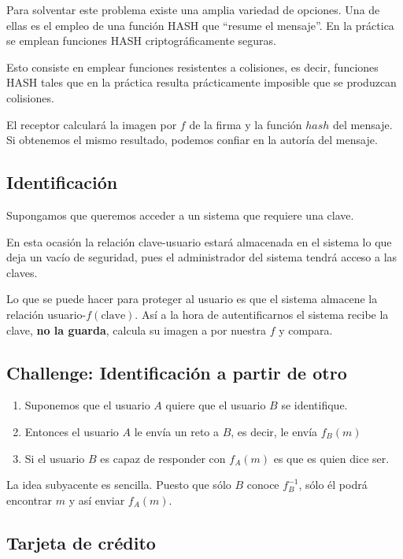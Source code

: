 Para solventar este problema existe una amplia variedad de opciones. Una de ellas es el empleo de una función HASH que ``resume el mensaje''. En la práctica se emplean funciones HASH criptográficamente seguras.

Esto consiste en emplear funciones resistentes a colisiones, es decir, funciones HASH tales que en la práctica resulta prácticamente imposible que se produzcan colisiones.

\begin{remark}
El receptor calculará la imagen por $f$ de la firma y la función $hash$ del mensaje. Si obtenemos el mismo resultado, podemos confiar en la autoría del mensaje.
\end{remark}

\subsection{Identificación}

Supongamos que queremos acceder a un sistema que requiere una clave.

En esta ocasión la relación clave-usuario estará almacenada en el sistema lo que deja un vacío de seguridad, pues el administrador del sistema tendrá acceso a las claves.

Lo que se puede hacer para proteger al usuario es que el sistema almacene la relación usuario-$f(\text{clave})$. Así a la hora de autentificarnos el sistema recibe la clave, \textbf{no la guarda}, calcula su imagen a por nuestra $f$ y compara.

\subsection{Challenge: Identificación a partir de otro}

\begin{enumerate}
\item Suponemos que el usuario $A$ quiere que el usuario $B$ se identifique.
\item Entonces el usuario $A$ le envía un reto a $B$, es decir, le envía $f_B(m)$
\item Si el usuario $B$ es capaz de responder con $f_A(m)$ es que es quien dice ser.
\end{enumerate}

La idea subyacente es sencilla. Puesto que sólo $B$ conoce $f_B^{-1}$, sólo él podrá encontrar $m$ y así enviar $f_A(m)$.

\subsection{Tarjeta de crédito}

